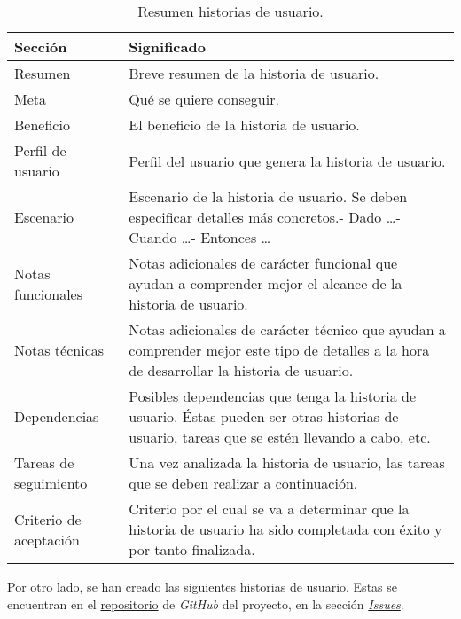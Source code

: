 \begin{table}[H]
    \centering
    \def\arraystretch{1.25}
    \begin{adjustbox}{max width=\textwidth}
    \begin{tabularx}{\textwidth}{l|L}
    \hline
        \textbf{Sección} & \textbf{Significado} \\ \hline
    \hline
        Resumen & Breve resumen de la historia de usuario. \\ \hline
        Meta & Qué se quiere conseguir. \\ \hline
        Beneficio & El beneficio de la historia de usuario. \\ \hline
        Perfil de usuario & Perfil del usuario que genera la historia de usuario. \\ \hline
        Escenario & Escenario de la historia de usuario. Se deben especificar detalles más concretos.\linebreak - Dado …\linebreak - Cuando …\linebreak - Entonces … \\ \hline
        Notas funcionales & Notas adicionales de carácter funcional que ayudan a comprender mejor el alcance de la historia de usuario. \\ \hline
        Notas técnicas & Notas adicionales de carácter técnico que ayudan a comprender mejor este tipo de detalles a la hora de desarrollar la historia de usuario. \\ \hline
        Dependencias & Posibles dependencias que tenga la historia de usuario. Éstas pueden ser otras historias de usuario, tareas que se estén llevando a cabo, etc. \\ \hline
        Tareas de seguimiento & Una vez analizada la historia de usuario, las tareas que se deben realizar a continuación. \\ \hline
        Criterio de aceptación & Criterio por el cual se va a determinar que la historia de usuario ha sido completada con éxito y por tanto finalizada. \\ \hline
    \end{tabularx}
    \end{adjustbox}
    \caption{Resumen historias de usuario.}
\end{table}

\bigskip

Por otro lado, se han creado las siguientes historias de usuario. Estas se encuentran en el \href{https://github.com/harvestcore/matroos}{repositorio} de \textit{GitHub} del proyecto, en la sección \href{https://github.com/harvestcore/matroos/labels/US}{\textit{Issues}}.

